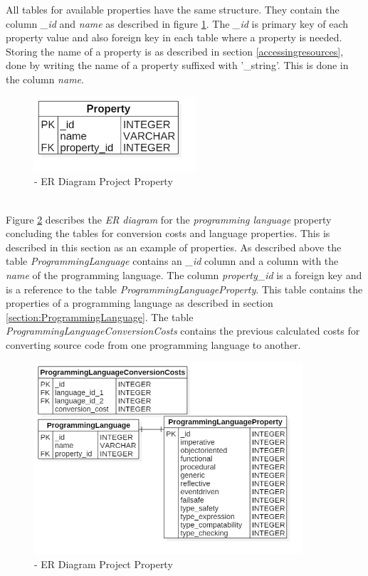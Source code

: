All tables for available properties have the same structure. They contain the column \textit{\_id} and \textit{name} as described in figure \ref{fig:erproperty}. The \textit{\_id} is primary key of each property value and also foreign key in each table where a property is needed. Storing the name of a property is as described in section \ref{accessingresources}, done by writing the name of a property suffixed with '\_string'. This is done in the column \textit{name}.\\
\begin{figure}[h] 
	\centering 
	\includegraphics[width=6cm]{images/ERProperty.png} 
	\caption{- ER Diagram Project Property} 
	\label{fig:erproperty}
\end{figure}\\
Figure \ref{fig:plproperty} describes the \textit{ER diagram} for the \textit{programming language} property concluding the tables for conversion costs and language properties. This is described in this section as an example of properties. As described above the table \textit{ProgrammingLanguage} contains an \textit{\_id} column and a column with the \textit{name} of the programming language. The column \textit{property\_id} is a foreign key and is a reference to the table \textit{ProgrammingLanguageProperty}. This table contains the properties of a programming language as described in section \ref{section:ProgrammingLanguage}. The table \textit{ProgrammingLanguageConversionCosts} contains the previous calculated costs for converting source code from one programming language to another.  
\begin{figure}[h] 
	\centering 
	\includegraphics[width=10cm]{images/PLProperty.png} 
	\caption{- ER Diagram Project Property} 
	\label{fig:plproperty}
\end{figure}\\


